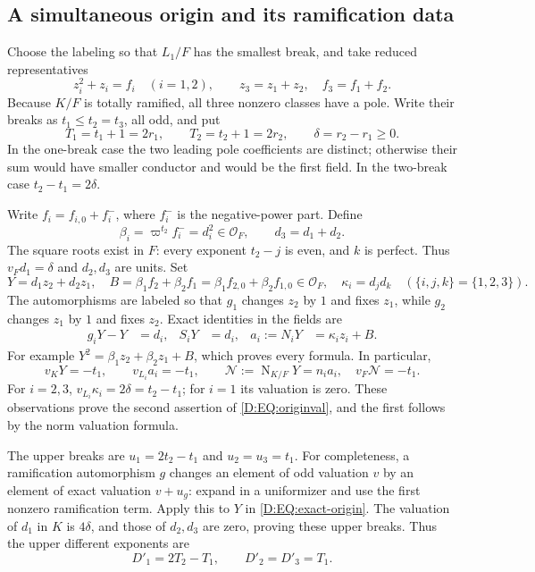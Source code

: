 \documentclass[11pt]{amsart}
\theoremstyle{definition}
\theoremstyle{remark}
\newcommand{\Nm}{\operatorname{N}}
\newcommand{\OO}{\mathcal O}\newcommand{\pp}{\mathfrak p}\newcommand{\PP}{\mathfrak P}
\begin{document}
\subsection{A simultaneous origin and its ramification data}
Choose the labeling so that $L_1/F$ has the smallest break, and take
reduced representatives
\[
 z_i^2+z_i=f_i\quad(i=1,2),\qquad z_3=z_1+z_2,\quad f_3=f_1+f_2.
\]
Because $K/F$ is totally ramified, all three nonzero classes have a pole.
Write their breaks as $t_1\le t_2=t_3$, all odd, and put
\begin{equation}\label{D:EQ:rledger}
 T_1=t_1+1=2r_1,\qquad T_2=t_2+1=2r_2,\qquad
 \delta=r_2-r_1\ge0.
\end{equation}
In the one-break case the two leading pole coefficients are distinct;
otherwise their sum would have smaller conductor and would be the
first field. In the two-break case $t_2-t_1=2\delta$.

Write $f_i=f_{i,0}+f_i^-$, where $f_i^-$ is the negative-power part.
Define
\begin{equation}\label{D:EQ:dbeta}
 \beta_i=\varpi^{t_2}f_i^-=d_i^2\in\OO_F,\qquad d_3=d_1+d_2.
\end{equation}
The square roots exist in $F$: every exponent $t_2-j$ is even, and
$k$ is perfect. Thus $v_Fd_1=\delta$ and $d_2,d_3$ are units.
Set
\begin{equation}\label{D:EQ:origin}
 Y=d_1z_2+d_2z_1,\quad
 B=\beta_1f_2+\beta_2f_1
       =\beta_1f_{2,0}+\beta_2f_{1,0}\in\OO_F,\quad
 \kappa_i=d_jd_k\quad(\{i,j,k\}=\{1,2,3\}).
\end{equation}
The automorphisms are labeled so that $g_1$ changes $z_2$ by $1$ and
fixes $z_1$, while $g_2$ changes $z_1$ by $1$ and fixes $z_2$.
Exact identities in the fields are
\begin{align}
 g_iY-Y&=d_i,&S_iY&=d_i,&
 a_i:=N_iY&=\kappa_i z_i+B.                         \label{D:EQ:exact-origin}
\end{align}
For example $Y^2=\beta_1z_2+\beta_2z_1+B$, which proves every formula.
In particular,
\begin{equation}\label{D:EQ:originval}
 v_KY=-t_1,\qquad v_{L_i}a_i=-t_1,\qquad
 \mathcal N:=\Nm_{K/F}Y=n_i a_i,\quad v_F\mathcal N=-t_1.
\end{equation}
For $i=2,3$, $v_{L_i}\kappa_i=2\delta=t_2-t_1$; for $i=1$ its
valuation is zero. These observations prove the second assertion of
\eqref{D:EQ:originval}, and the first follows by the norm valuation formula.

The upper breaks are $u_1=2t_2-t_1$ and $u_2=u_3=t_1$.
For completeness, a ramification automorphism $g$ changes an element
of odd valuation $v$ by an element of exact valuation $v+u_g$:
expand in a uniformizer and use the first nonzero ramification term.
Apply this to $Y$ in \eqref{D:EQ:exact-origin}. The valuation of $d_1$ in $K$
is $4\delta$, and those of $d_2,d_3$ are zero, proving these upper
breaks. Thus the upper different exponents are
\begin{equation}\label{D:EQ:upperdifferent}
 D'_1=2T_2-T_1,\qquad D'_2=D'_3=T_1.
\end{equation}
\end{document}
